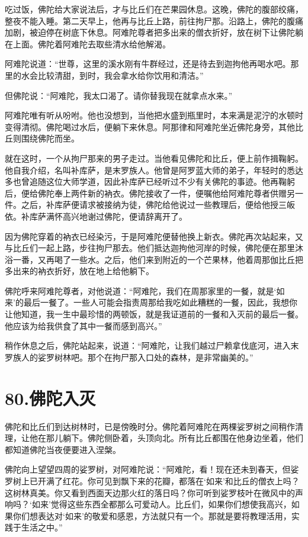 \documentclass[12pt,twoside,openany]{book}
\begin{document}
吃过饭，佛陀给大家说法后，才与比丘们在芒果园休息。这晚，佛陀的腹部绞痛，整夜不能入睡。第二天早上，他再与比丘上路，前往拘尸那。沿路上，佛陀的腹痛加剧，被迫停在树底下休息。阿难陀尊者把多出来的僧衣折好，放在树下让佛陀躺在上面。佛陀着阿难陀去取些清水给他解渴。

阿难陀说道：“世尊，这里的溪水刚有牛群经过，还是待去到迦拘他再喝水吧。那里的水会比较清甜，到时，我会拿水给你饮用和清洁。”

但佛陀说：“阿难陀，我太口渴了。请你替我现在就拿点水来。”

阿难陀唯有听从吩咐。他也没想到，当他把水盛到瓶里时，本来满是泥泞的水顿时变得清彻。佛陀喝过水后，便躺下来休息。阿那律和阿难陀坐近佛陀身旁，其他比丘则围绕佛陀而坐。

就在这时，一个从拘尸那来的男子走过。当他看见佛陀和比丘，便上前作揖鞠躬。他自我介绍，名叫补库萨，是末罗族人。他曾是阿罗蓝大师的弟子，年轻时的悉达多也曾追随这位大师学道，因此补库萨已经听过不少有关佛陀的事迹。他再鞠躬后，便给佛陀奉上两件新的衲衣。佛陀接收了一件，便嘱他给阿难陀尊者供赠另一件。之后，补库萨便请求被接纳为徒，佛陀给他说过一些教理后，便给他授三皈依。补库萨满怀高兴地谢过佛陀，便请辞离开了。

因为佛陀穿着的衲衣已经染污，于是阿难陀便替他换上新衣。佛陀再次站起来，又与比丘们一起上路，步往拘尸那去。他们抵达迦拘他河岸的时候，佛陀便在那里沐浴一番，又再喝了一些水。之后，他们来到附近的一个芒果林，他着周那伽比丘把多出来的衲衣折好，放在地上给他躺下。

佛陀呼来阿难陀尊者，对他说道：“阿难陀，我们在周那家里的一餐，就是‘如来’的最后一餐了。一些人可能会指责周那给我吃如此糟糕的一餐，因此，我想你让他知道，我一生中最珍惜的两顿饭，就是我证道前的一餐和入灭前的最后一餐。他应该为给我供食了其中一餐而感到高兴。”

稍作休息之后，佛陀站起来，说道：“阿难陀，让我们越过尸赖拿伐底河，进入末罗族人的娑罗树林吧。那个在拘尸那入口处的森林，是非常幽美的。”


\chapter{80.佛陀入灭}\label{ch80}

佛陀和比丘们到达树林时，已是傍晚时分。佛陀着阿难陀在两棵娑罗树之间稍作清理，让他在那儿躺下。佛陀侧卧着，头顶向北。所有比丘都围在他身边坐着，他们都知道佛陀当夜便要进入涅槃。

佛陀向上望望四周的娑罗树，对阿难陀说：“阿难陀，看！现在还未到春天，但娑罗树上已开满了红花。你可见到飘下来的花瓣，都落在‘如来’和比丘的僧衣上吗？这树林真美。你又看到西面天边那火红的落日吗？你可听到娑罗枝叶在微风中的声响吗？‘如来’觉得这些东西全都那么可爱动人。比丘们，如果你们想使我高兴，如果你们想表达对‘如来’的敬爱和感恩，方法就只有一个。那就是要将教理活用，实践于生活之中。”
\end{document}
